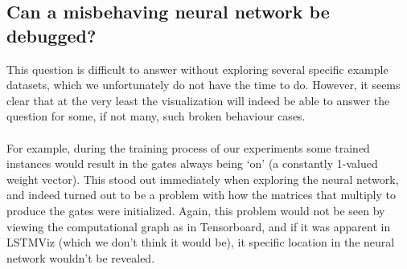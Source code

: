 \documentclass[journal]{vgtc}                %
\begin{document}
\subsection{Can a misbehaving neural network be debugged?}
This question is difficult to answer without exploring several specific example datasets, which we unfortunately do not have the time to do.
However, it seems clear that at the very least the visualization will indeed be able to answer the question for some, if not many, such broken behaviour cases.
\\
\\
For example, during the training process of our experiments some trained instances would result in the gates always being `on' (a constantly 1-valued weight vector).
This stood out immediately when exploring the neural network, and indeed turned out to be a problem with how the matrices that multiply to produce the gates were initialized.
Again, this problem would not be seen by viewing the computational graph as in Tensorboard, and if it was apparent in LSTMViz (which we don't think it would be), it specific location in the neural network wouldn't be revealed.
\end{document}
